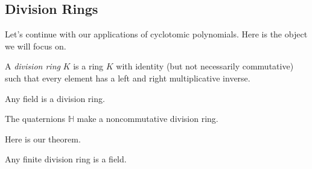 \subsection{Division Rings}
Let's continue with our applications of cyclotomic polynomials. Here is the object we will focus on.
\begin{definition}
	A \textit{division ring} $K$ is a ring $K$ with identity (but not necessarily commutative) such that every element has a left and right multiplicative inverse.
\end{definition}
\begin{example}
	Any field is a division ring.
\end{example}
\begin{example}
	The quaternions $\mathbb H$ make a noncommutative division ring.
\end{example}
Here is our theorem.
\begin{theorem}[Wedderburn]
	Any finite division ring is a field.
\end{theorem}
